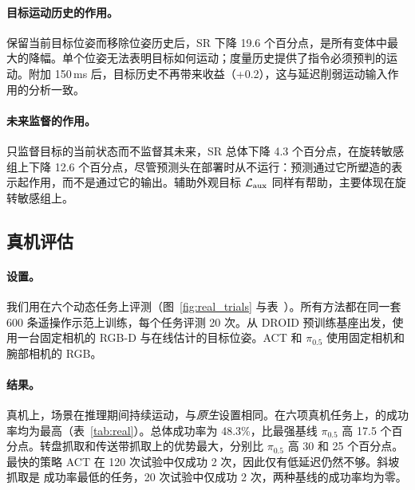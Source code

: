 \paragraph{目标运动历史的作用。}
保留当前目标位姿而移除位姿历史后，SR 下降 19.6 个百分点，是所有变体中最大的降幅。单个位姿无法表明目标如何运动；度量历史提供了指令必须预判的运动。附加 150\,ms 后，目标历史不再带来收益（+0.2），这与延迟削弱运动输入作用的分析一致。

\paragraph{未来监督的作用。}
只监督目标的当前状态而不监督其未来，SR 总体下降 4.3 个百分点，在旋转敏感组上下降 12.6 个百分点，尽管预测头在部署时从不运行：预测通过它所塑造的表示起作用，而不是通过它的输出。辅助外观目标 $\mathcal L_{\rm aux}$ 同样有帮助，主要体现在旋转敏感组上。

\subsection{真机评估}
\label{sec:real}



\paragraph{设置。}
我们用\cfgRobotZh{}在六个动态任务上评测（图~\ref{fig:real_trials} 与表~）。所有方法都在同一套 600 条遥操作示范上训练，每个任务评测 20 次。\ours 从 DROID \cite{droid} 预训练基座出发，使用一台固定相机的 RGB-D 与在线估计的目标位姿。ACT 和 $\pi_{0.5}$ 使用固定相机和腕部相机的 RGB。


\FloatBarrier

\paragraph{结果。}
真机上，场景在推理期间持续运动，与\emph{原生}设置相同。在六项真机任务上，\ours 的成功率均为最高（表~\ref{tab:real}）。总体成功率为 48.3\%，比最强基线 $\pi_{0.5}$ 高 17.5 个百分点。转盘抓取和传送带抓取上的优势最大，分别比 $\pi_{0.5}$ 高 30 和 25 个百分点。最快的策略 ACT 在 120 次试验中仅成功 2 次，因此仅有低延迟仍然不够。斜坡抓取是 \ours 成功率最低的任务，20 次试验中仅成功 2 次，两种基线的成功率均为零。
